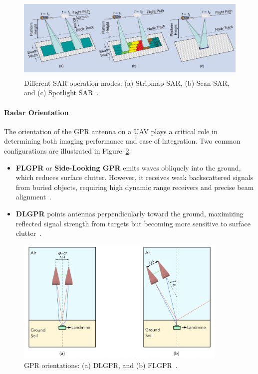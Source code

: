 \begin{figure}[H]
    \centering
    \includegraphics[height=4cm]{figs/Huirui/sar_modes.png}
    \caption{Different \gls{SAR} operation modes: (a) Stripmap SAR, (b) Scan SAR, and (c) Spotlight SAR~\cite{moreira2013tutorial}.}
    \label{fig:sar_modes}
\end{figure}


\paragraph{Radar Orientation}

The orientation of the \gls{GPR} antenna on a \gls{UAV} plays a critical role in determining both imaging performance and ease of integration. Two common configurations are illustrated in Figure~\ref{fig:GPR_Ori_modes}:

\begin{itemize}
    \item \textbf{\gls{FLGPR}} or \textbf{Side-Looking \gls{GPR}} emits waves obliquely into the ground, which reduces surface clutter. However, it receives weak backscattered signals from buried objects, requiring high dynamic range receivers and precise beam alignment~\cite{garcia2020airborne}.

    \item \textbf{\gls{DLGPR}} points antennas perpendicularly toward the ground, maximizing reflected signal strength from targets but becoming more sensitive to surface clutter~\cite{garcia2020airborne}.
\end{itemize}

\begin{figure}[H]
    \centering
    \includegraphics[height=6cm]{figs/Huirui/gpr_ori_modes.png}
    \caption{\gls{GPR} orientations: (a) \gls{DLGPR}, and (b) \gls{FLGPR}~\cite{vsipovs2020lightweight}.}
    \label{fig:GPR_Ori_modes}
\end{figure}



